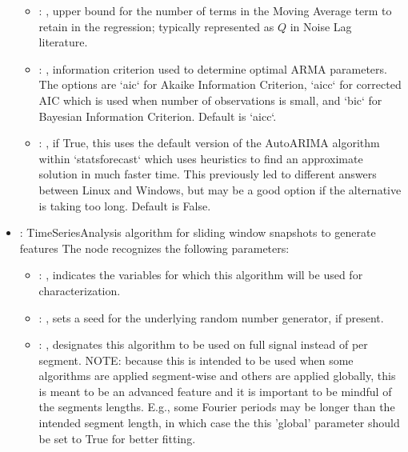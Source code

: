 \begin{itemize}
\begin{itemize}
        \item {}: , 
          upper bound for the number of terms in the Moving Average term to retain
          in the regression; typically represented as $Q$ in Noise Lag
          literature.

        \item {}: , 
          information criterion used to determine optimal ARMA parameters. The
          options are `aic` for Akaike Information Criterion, `aicc` for corrected AIC which
          is used when number of observations is small, and `bic` for Bayesian Information
          Criterion. Default is `aicc`.

        \item {}: , 
          if True, this uses the default version of the AutoARIMA algorithm                  within
          `statsforecast` which uses heuristics to find an approximate solution                  in
          much faster time. This previously led to different answers between Linux and
          Windows, but may be a good option if the alternative is taking too long.
          Default is False.
      \end{itemize}

    \item {}:
      TimeSeriesAnalysis algorithm for sliding window snapshots to generate features
      The  node recognizes the following parameters:
        \begin{itemize}
          \item {}: , 
            indicates the variables for which this algorithm will be used for characterization.
          \item {}: , 
            sets a seed for the underlying random number generator, if present.
          \item {}: , 
            designates this algorithm to be used on full signal instead of per
            segment. NOTE: because this is intended to be used when some algorithms are
            applied segment-wise and others are applied globally, this is meant to be an
            advanced feature and it is important to be mindful of the segments lengths.
            E.g., some Fourier periods may be longer than the intended segment length, in
            which case the this 'global' parameter should be set to True for better
            fitting. 
      \end{itemize}


\end{itemize}
